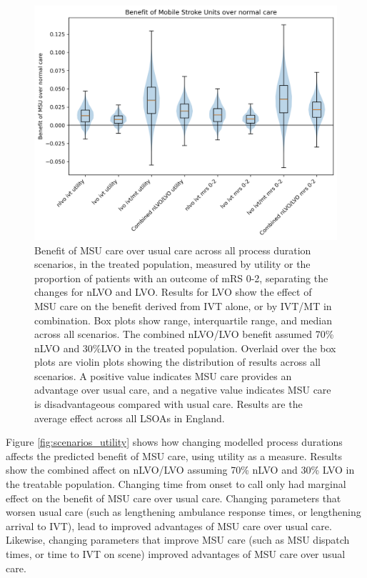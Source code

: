 \begin{figure}[h!]
    \centering
    \includegraphics[width=0.6\linewidth]{images/scenario_results_summary.png}
    \caption{Benefit of MSU care over usual care across all process duration scenarios, in the treated population, measured by utility or the proportion of patients with an outcome of mRS 0-2, separating the changes for nLVO and LVO. Results for LVO show the effect of MSU care on the benefit derived from IVT alone, or by IVT/MT in combination. Box plots show range, interquartile range, and median across all scenarios. The combined nLVO/LVO benefit assumed 70\% nLVO and 30\%LVO in the treated population. Overlaid over the box plots are violin plots showing the distribution of results across all scenarios. A positive value indicates MSU care provides an advantage over usual care, and a negative value indicates MSU care is disadvantageous compared with usual care. Results are the average effect across all LSOAs in England.}
    \label{fig:scenarios_overview}
\end{figure}



Figure \ref{fig:scenarios_utility} shows how changing modelled process durations affects the predicted benefit of MSU care, using utility as a measure. Results show the combined affect on nLVO/LVO assuming 70\% nLVO and 30\% LVO  in the treatable population. Changing time from onset to call only had marginal effect on the benefit of MSU care over usual care. Changing parameters that worsen usual care (such as lengthening ambulance response times, or lengthening arrival to IVT), lead to improved advantages of MSU care over usual care. Likewise, changing parameters that improve MSU care (such as MSU dispatch times, or time to IVT on scene) improved advantages of MSU care over usual care.

